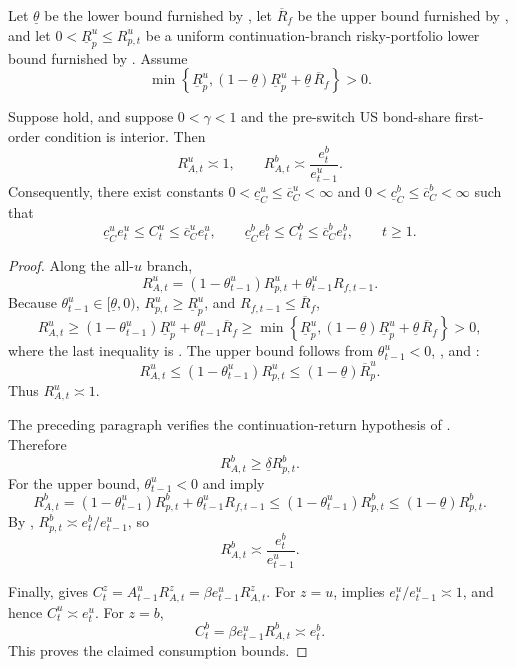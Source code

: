 \documentclass{article}
\begin{document}
\begin{ass}\label{ass_positive_u_total_saving_return}\label{ass_positive_total_saving_return}
Let $\underline\theta$ be the lower bound furnished by , let $\overline R_f$ be the upper bound furnished by , and let $0<\underline R_p^u\le R_{p,t}^u$ be a uniform continuation-branch risky-portfolio lower bound furnished by . Assume
\[
\min\left\{
\underline R_p^u,
(1-\underline\theta)\underline R_p^u+\underline\theta\,\overline R_f
\right\}>0.
\]
\end{ass}

\begin{lem}\label{lem_total_return_consumption_bounds}
Suppose  hold, and suppose $0<\gamma<1$ and the pre-switch US bond-share first-order condition is interior. Then
\[
R_{A,t}^u\asymp 1,
\qquad
R_{A,t}^b\asymp \frac{e_t^b}{e_{t-1}^u}.
\]
Consequently, there exist constants $0<\underline c_C^u\le \overline c_C^u<\infty$ and $0<\underline c_C^b\le \overline c_C^b<\infty$ such that
\[
\underline c_C^u e_t^u\le C_t^u\le \overline c_C^u e_t^u,
\qquad
\underline c_C^b e_t^b\le C_t^b\le \overline c_C^b e_t^b,
\qquad
t\ge 1.
\]
\end{lem}

\begin{proof}
Along the all-$u$ branch,
\[
R_{A,t}^u=(1-\theta_{t-1}^u)R_{p,t}^u+\theta_{t-1}^uR_{f,t-1}.
\]
Because $\theta_{t-1}^u\in[\underline\theta,0)$, $R_{p,t}^u\ge\underline R_p^u$, and $R_{f,t-1}\le\overline R_f$,
\[
R_{A,t}^u
\ge
(1-\theta_{t-1}^u)\underline R_p^u+\theta_{t-1}^u\overline R_f
\ge
\min\left\{
\underline R_p^u,
(1-\underline\theta)\underline R_p^u+\underline\theta\,\overline R_f
\right\}>0,
\]
where the last inequality is . The upper bound follows from $\theta_{t-1}^u<0$, , and :
\[
R_{A,t}^u
\le
(1-\theta_{t-1}^u)R_{p,t}^u
\le
(1-\underline\theta)\overline R_p^u.
\]
Thus $R_{A,t}^u\asymp1$.

The preceding paragraph verifies the continuation-return hypothesis of . Therefore
\[
R_{A,t}^b\ge\underline\delta R_{p,t}^b.
\]
For the upper bound, $\theta_{t-1}^u<0$ and  imply
\[
R_{A,t}^b
=(1-\theta_{t-1}^u)R_{p,t}^b+\theta_{t-1}^uR_{f,t-1}
\le
(1-\theta_{t-1}^u)R_{p,t}^b
\le
(1-\underline\theta)R_{p,t}^b.
\]
By , $R_{p,t}^b\asymp e_t^b/e_{t-1}^u$, so
\[
R_{A,t}^b\asymp \frac{e_t^b}{e_{t-1}^u}.
\]

Finally,  gives $C_t^z=A_{t-1}^uR_{A,t}^z=\beta e_{t-1}^uR_{A,t}^z$. For $z=u$,  implies $e_t^u/e_{t-1}^u\asymp1$, and hence $C_t^u\asymp e_t^u$. For $z=b$,
\[
C_t^b=\beta e_{t-1}^uR_{A,t}^b\asymp e_t^b.
\]
This proves the claimed consumption bounds.
\end{proof}
\end{document}
